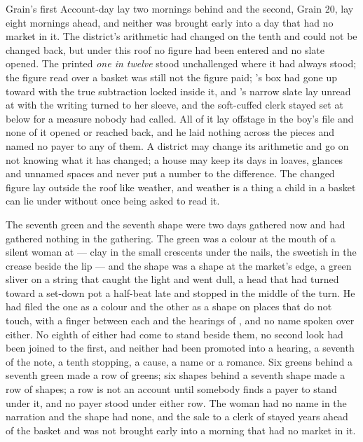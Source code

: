\scenebreak

Grain's first Account-day lay two mornings behind and the second, Grain 20, lay eight mornings ahead, and neither was brought early into a day that had no market in it. The district's arithmetic had changed on the tenth and could not be changed back, but under this roof no figure had been entered and no slate opened. The printed \emph{one in twelve} stood unchallenged where it had always stood; the figure read over a basket was still not the figure paid; 's box had gone up  toward  with the true subtraction locked inside it, and 's narrow slate lay unread at  with the writing turned to her sleeve, and the soft-cuffed clerk stayed set at  below  for a measure nobody had called. All of it lay offstage in the boy's file and none of it opened or reached back, and he laid nothing across the pieces and named no payer to any of them. A district may change its arithmetic and go on not knowing what it has changed; a house may keep its days in loaves, glances and unnamed spaces and never put a number to the difference. The changed figure lay outside the roof like weather, and weather is a thing a child in a basket can lie under without once being asked to read it.

The seventh green and the seventh shape were two days gathered now and had gathered nothing in the gathering. The green was a colour at the mouth of a silent woman at  --- clay in the small crescents under the nails, the sweetish  in the crease beside the lip --- and the shape was a shape at the market's edge, a green sliver on a string that caught the light and went dull, a head that had turned toward a set-down pot a half-beat late and stopped in the middle of the turn. He had filed the one as a colour and the other as a shape on places that do not touch, with a finger between each and the hearings of , and no name spoken over either. No eighth of either had come to stand beside them, no second look had been joined to the first, and neither had been promoted into a hearing, a seventh of the note, a tenth stopping, a cause, a name or a romance. Six greens behind a seventh green made a row of greens; six shapes behind a seventh shape made a row of shapes; a row is not an account until somebody finds a payer to stand under it, and no payer stood under either row. The woman had no name in the narration and the shape had none, and the sale to a clerk of  stayed years ahead of the basket and was not brought early into a morning that had no market in it.

